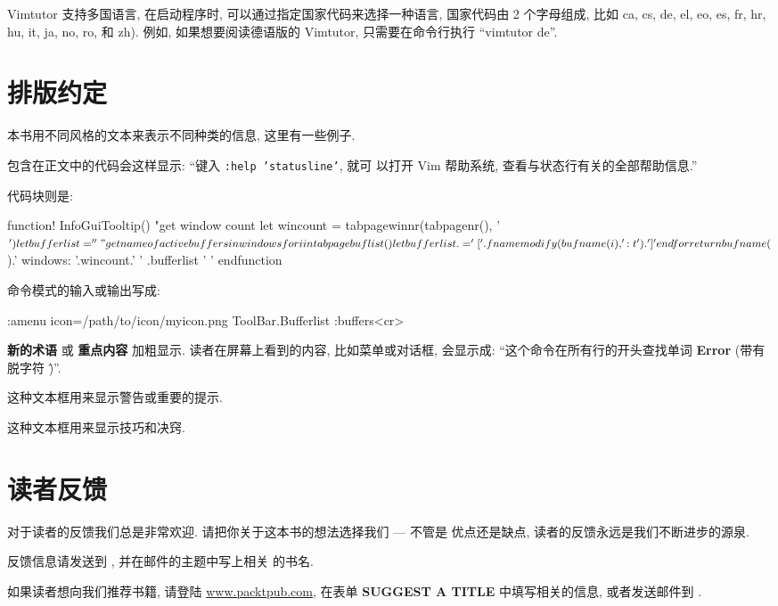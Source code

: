 Vimtutor 支持多国语言, 在启动程序时, 可以通过指定国家代码来选择一种语言, 
国家代码由 2 个字母组成, 比如 ca, cs, de, el, eo, es, fr, hr, hu, it, ja,
no, ro, 和 zh). 例如, 如果想要阅读德语版的 Vimtutor, 只需要在命令行执行
``vimtutor de''.

\section*{排版约定}
\label{sec:conventions}
本书用不同风格的文本来表示不同种类的信息, 这里有一些例子.

包含在正文中的代码会这样显示: ``键入 \texttt{:help 'statusline'}, 就可
以打开 Vim 帮助系统, 查看与状态行有关的全部帮助信息.''

代码块则是:
\begin{vimscript}
function! InfoGuiTooltip()
    "get window count
    let wincount = tabpagewinnr(tabpagenr(), '$')
    let bufferlist=''
    "get name of active buffers in windows
    for i in tabpagebuflist()
        let bufferlist .= '['.fnamemodify(bufname(i), ':t').'] '
    endfor
    return bufname($).' windows: '.wincount.' ' .bufferlist ' '
endfunction
\end{vimscript}

命令模式的输入或输出写成:
\begin{vimcmd}
:amenu icon=/path/to/icon/myicon.png ToolBar.Bufferlist :buffers<cr>
\end{vimcmd}

\textbf{新的术语} 或 \textbf{重点内容} 加粗显示. 读者在屏幕上看到的内容,
比如菜单或对话框, 会显示成: ``这个命令在所有行的开头查找单词 \textbf{Error}
(带有脱字符 \^)''.

\begin{warning}
这种文本框用来显示警告或重要的提示.
\end{warning}

\begin{tips}
这种文本框用来显示技巧和决窍.
\end{tips}

\section*{读者反馈}
\label{sec:reader_feedback}
对于读者的反馈我们总是非常欢迎. 请把你关于这本书的想法选择我们 --- 不管是
优点还是缺点, 读者的反馈永远是我们不断进步的源泉.

反馈信息请发送到 , 并在邮件的主题中写上相关
的书名.

如果读者想向我们推荐书籍, 请登陆 \url{www.packtpub.com}, 在表单 
\textbf{SUGGEST A TITLE} 中填写相关的信息, 或者发送邮件到 
.

